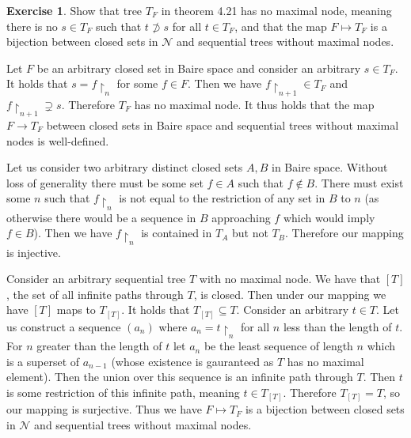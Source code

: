 \documentclass{article}
\theoremstyle{definition}
\newtheorem{exer}{Exercise}[section]
\newlength{\defparindent}
\newenvironment{answer}
    {\begin{mdframed}[backgroundcolor=gray!15, linewidth=0pt] \setlength{\parindent}{\defparindent}}
    {\end{mdframed}}
\begin{document}
\begin{exer}
    Show that tree $T_F$ in theorem 4.21 has no maximal node, meaning there is no $s \in T_F$ such that $t \not\supset s$ for all $t \in T_F$, and that the map $F \mapsto T_F$ is a bijection between closed sets in $\mathcal{N}$ and sequential trees without maximal nodes.
    \begin{answer}
        Let $F$ be an arbitrary closed set in Baire space and consider an arbitrary $s \in T_F$. It holds that $s = f\restriction_{n}$ for some $f \in F$. Then we have $f\restriction_{n + 1} \in T_F$ and $f\restriction_{n + 1} \supsetneq s$. Therefore $T_F$ has no maximal node. It thus holds that the map $F \to T_F$ between closed sets in Baire space and sequential trees without maximal nodes is well-defined. 
        
        Let us consider two arbitrary distinct closed sets $A, B$ in Baire space. Without loss of generality there must be some set $f \in A$ such that $f \not\in B$. There must exist some $n$ such that $f\restriction_{n}$ is not equal to the restriction of any set in $B$ to $n$ (as otherwise there would be a sequence in $B$ approaching $f$ which would imply $f \in B$). Then we have $f\restriction_n$ is contained in $T_A$ but not $T_B$. Therefore our mapping is injective.

        Consider an arbitrary sequential tree $T$ with no maximal node. We have that $[T]$, the set of all infinite paths through $T$, is closed. Then under our mapping we have $[T]$ maps to $T_{[T]}$. It holds that $T_{[T]} \subseteq T$. Consider an arbitrary $t \in T$. Let us construct a sequence $(a_n)$ where $a_n = t\restriction_{n}$ for all $n$ less than the length of $t$. For $n$ greater than the length of $t$ let $a_n$ be the least sequence of length $n$ which is a superset of $a_{n  - 1}$ (whose existence is gauranteed as $T$ has no maximal element). Then the union over this sequence is an infinite path through $T$. Then $t$ is some restriction of this infinite path, meaning $t \in T_{[T]}$. Therefore $T_{[T]} = T$, so our mapping is surjective. Thus we have $F \mapsto T_F$ is a bijection between closed sets in $\mathcal{N}$ and sequential trees without maximal nodes.
    \end{answer}
\end{exer}
\end{document}
